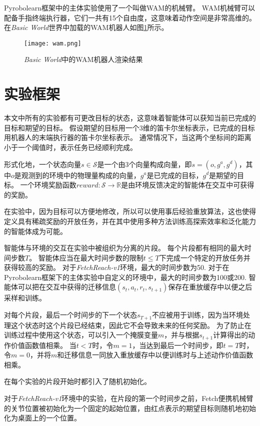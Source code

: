 Pyrobolearn框架中的主体实验使用了一个叫做WAM的机械臂。
WAM机械臂可以配备手指终端执行器，它们一共有15个自由度，这意味着动作空间是非常高维的。
在\emph{Basic World}世界中加载的WAM机器人如图\ref{wam}所示。
    \begin{figure}
        \centering
        \texttt{[image: wam.png]}
        \caption{\emph{Basic World}中的WAM机器人渲染结果}
        \label{wam}
    \end{figure}

\section{实验框架}\label{expframe}
本文中所有的实验都有可更改目标的状态，这意味着智能体可以获知当前已完成的目标和期望的目标。
假设期望的目标用一个3维的笛卡尔坐标表示，已完成的目标用机器人的末端执行器的笛卡尔坐标表示。
通常情况下，当这两个坐标间的距离小于一个阈值时，表示任务已经顺利完成。

形式化地，一个状态向量$s\in\mathcal S$是一个由3个向量构成向量，即$s=(o,g^a,g^d)$，其中$o$是观测到的环境中的物理量构成的向量，$g^a$是已完成的目标，$g^d$是期望的目标。
一个环境奖励函数$reward:\mathcal S\to \mathbb R$是由环境反馈决定的智能体在交互中可获得的奖励。

在实验中，因为目标可以方便地修改，所以可以使用事后经验重放算法，这也使得定义具有稀疏奖励的开放任务，并在其中使用多种方法训练高探索效率和泛化能力的智能体成为可能。

智能体与环境的交互在实验中被组织为分离的片段。
每个片段都有相同的最大时间步数$T$。
智能体应当在最大时间步数的限制$t\leq T$下完成一个特定的开放任务并获得较高的奖励。
对于\emph{FetchReach-v1}环境，最大的时间步数为50.
对于在Pyrobolearn框架下的主体实验中自定义的环境中，最大的时间步数为100或200.
智能体可以把在交互中获得的迁移信息$(s_t,a_t,r_t,s_{t+1})$保存在重放缓存中以便之后采样和训练。

对每个片段，最后一个时间步的下一个状态$s_{T+1}$不应被用于训练，因为当环境处理这个状态时这个片段已经结束，因此它不会导致未来的任何奖励。
为了防止在训练过程中使用这个状态，可以引入一个掩膜变量$m$，并与根据$s_{t+1}$计算得出的动作价值函数值相乘。
当$t<T$时，令$m=1$，当达到最后一个时间步，即$t=T$时，令$m=0$，并将$m$和迁移信息一同放入重放缓存中以便训练时与上述动作价值函数相乘。

在每个实验的片段开始时都引入了随机初始化。

对于\emph{FetchReach-v1}环境中的实验，在片段的第一个时间步之前，Fetch便携机械臂的关节位置被初始化为一个固定的起始位置，由红点表示的期望目标则随机地初始化为桌面上的一个位置。

